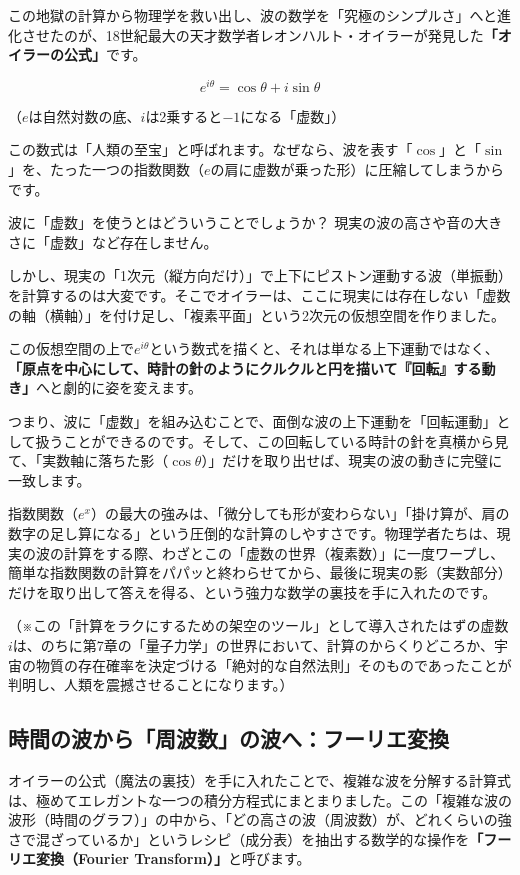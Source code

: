 この地獄の計算から物理学を救い出し、波の数学を「究極のシンプルさ」へと進化させたのが、18世紀最大の天才数学者レオンハルト・オイラーが発見した\textbf{「オイラーの公式」}です。

\[e^{i\theta} = \cos\theta + i\sin\theta\]

（\(e\)は自然対数の底、\(i\)は2乗すると\(-1\)になる「虚数」）

この数式は「人類の至宝」と呼ばれます。なぜなら、波を表す「\(\cos\)」と「\(\sin\)」を、たった一つの指数関数（\(e\)の肩に虚数が乗った形）に圧縮してしまうからです。

波に「虚数」を使うとはどういうことでしょうか？ 現実の波の高さや音の大きさに「虚数」など存在しません。

しかし、現実の「1次元（縦方向だけ）」で上下にピストン運動する波（単振動）を計算するのは大変です。そこでオイラーは、ここに現実には存在しない「虚数の軸（横軸）」を付け足し、「複素平面」という2次元の仮想空間を作りました。

この仮想空間の上で\(e^{i\theta}\)という数式を描くと、それは単なる上下運動ではなく、\textbf{「原点を中心にして、時計の針のようにクルクルと円を描いて『回転』する動き」}へと劇的に姿を変えます。

つまり、波に「虚数」を組み込むことで、面倒な波の上下運動を「回転運動」として扱うことができるのです。そして、この回転している時計の針を真横から見て、「実数軸に落ちた影（\(\cos\theta\)）」だけを取り出せば、現実の波の動きに完璧に一致します。

指数関数（\(e^{x}\)）の最大の強みは、「微分しても形が変わらない」「掛け算が、肩の数字の足し算になる」という圧倒的な計算のしやすさです。物理学者たちは、現実の波の計算をする際、わざとこの「虚数の世界（複素数）」に一度ワープし、簡単な指数関数の計算をパパッと終わらせてから、最後に現実の影（実数部分）だけを取り出して答えを得る、という強力な数学の裏技を手に入れたのです。

（※この「計算をラクにするための架空のツール」として導入されたはずの虚数\(i\)は、のちに第7章の「量子力学」の世界において、計算のからくりどころか、宇宙の物質の存在確率を決定づける「絶対的な自然法則」そのものであったことが判明し、人類を震撼させることになります。）

\subsection{時間の波から「周波数」の波へ：フーリエ変換}

オイラーの公式（魔法の裏技）を手に入れたことで、複雑な波を分解する計算式は、極めてエレガントな一つの積分方程式にまとまりました。この「複雑な波の波形（時間のグラフ）」の中から、「どの高さの波（周波数）が、どれくらいの強さで混ざっているか」というレシピ（成分表）を抽出する数学的な操作を\textbf{「フーリエ変換（Fourier Transform）」}と呼びます。

